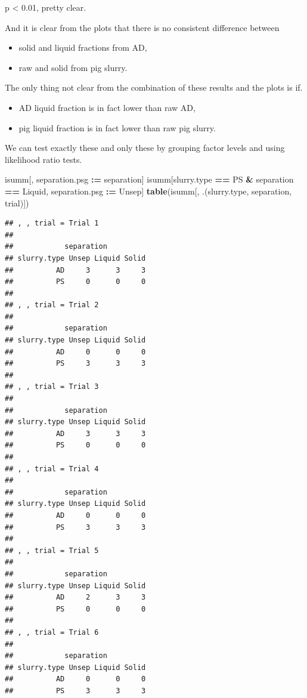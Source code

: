 \documentclass[
]{article}
\newenvironment{Shaded}{\begin{snugshade}}{\end{snugshade}}
\newcommand{\FunctionTok}[1]{\textcolor[rgb]{0.13,0.29,0.53}{\textbf{#1}}}
\newcommand{\NormalTok}[1]{#1}
\newcommand{\SpecialCharTok}[1]{\textcolor[rgb]{0.81,0.36,0.00}{\textbf{#1}}}
\newcommand{\StringTok}[1]{\textcolor[rgb]{0.31,0.60,0.02}{#1}}
\providecommand{\tightlist}{%
  \setlength{\itemsep}{0pt}\setlength{\parskip}{0pt}}
\begin{document}
p \textless{} 0.01, pretty clear.

And it is clear from the plots that there is no consistent difference
between

\begin{itemize}
\tightlist
\item
  solid and liquid fractions from AD,
\item
  raw and solid from pig slurry.
\end{itemize}

The only thing not clear from the combination of these results and the
plots is if.

\begin{itemize}
\tightlist
\item
  AD liquid fraction is in fact lower than raw AD,
\item
  pig liquid fraction is in fact lower than raw pig slurry.
\end{itemize}

We can test exactly these and only these by grouping factor levels and
using likelihood ratio tests.

\begin{Shaded}
\begin{Highlighting}[]
\NormalTok{isumm[, separation.psg }\SpecialCharTok{:=}\NormalTok{ separation]}
\NormalTok{isumm[slurry.type }\SpecialCharTok{==} \StringTok{\textquotesingle{}PS\textquotesingle{}} \SpecialCharTok{\&}\NormalTok{ separation }\SpecialCharTok{==} \StringTok{\textquotesingle{}Liquid\textquotesingle{}}\NormalTok{, separation.psg }\SpecialCharTok{:=} \StringTok{\textquotesingle{}Unsep\textquotesingle{}}\NormalTok{]}
\FunctionTok{table}\NormalTok{(isumm[, .(slurry.type, separation, trial)])}
\end{Highlighting}
\end{Shaded}

\begin{verbatim}
## , , trial = Trial 1
## 
##            separation
## slurry.type Unsep Liquid Solid
##          AD     3      3     3
##          PS     0      0     0
## 
## , , trial = Trial 2
## 
##            separation
## slurry.type Unsep Liquid Solid
##          AD     0      0     0
##          PS     3      3     3
## 
## , , trial = Trial 3
## 
##            separation
## slurry.type Unsep Liquid Solid
##          AD     3      3     3
##          PS     0      0     0
## 
## , , trial = Trial 4
## 
##            separation
## slurry.type Unsep Liquid Solid
##          AD     0      0     0
##          PS     3      3     3
## 
## , , trial = Trial 5
## 
##            separation
## slurry.type Unsep Liquid Solid
##          AD     2      3     3
##          PS     0      0     0
## 
## , , trial = Trial 6
## 
##            separation
## slurry.type Unsep Liquid Solid
##          AD     0      0     0
##          PS     3      3     3
\end{verbatim}
\end{document}
